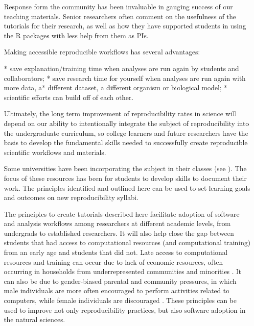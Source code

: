 \documentclass[12pt]{article}
\begin{document}
Response form the community has been invaluable in gauging success of our teaching
materials.
Senior researchers often comment on the usefulness
of the tutorials for their research, as well as how they have supported students in using the
R packages with less help from them as PIs.

Making accessible reproducible workflows has several advantages:

* save explanation/training time when analyses are run again by students and collaborators;
* save research time for yourself when analyses are run again with more data, a* different dataset, a different organism or biological model;
* scientific efforts can build off of each other.


Ultimately, the long term improvement of reproducibility rates in science will depend
on our ability to intentionally integrate the subject of reproducibility into the
undergraduate curriculum, so college learners and future researchers have the
basis to develop the fundamental skills needed to successfully create reproducible
scientific workflows and materials.

Some universities have been incorporating the subject in their classes (see
\cite{uwlibraries2022, nigms2022}).
The focus of these resources has been for students to develop skills to document their work.
The principles identified and outlined here can be used to set learning goals and
outcomes on new reproducibility syllabi.

The principles to create tutorials described here facilitate adoption of software
 and analysis workflows among researchers at different academic levels, from undergrads
  to established researchers.
It will also help close the gap between students that had access to computational
resources (and computational training) from an early age and students that did not.
Late access to computational resources and training can occur due to lack of
economic resources, often occurring in households from underrepresented communities
and minorities \citep{google2016diversity, warner2021quantifying}.
It can also be due to gender-biased parental and community pressures,
in which male individuals are more often encouraged to perform activities related to computers,
while female individuals are discouraged \citep{warner2021quantifying}.
These principles can be used to improve not only reproducibility practices,
 but also software adoption in the natural sciences.
\end{document}
